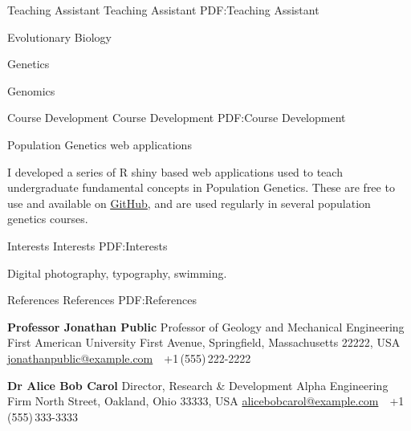 \documentclass[letterpaper,MMMyyyy,nonstopmode]{simpleresumecv}
\begin{document}
\begin{Body}
{{\SubSection
{Teaching Assistant}
{Teaching Assistant}
{PDF:Teaching Assistant}

\Gap
\BulletItem
Evolutionary Biology
\hfill
{}

\Gap
\BulletItem
Genetics
\hfill
{}

\Gap
\BulletItem
Genomics
\hfill
{}


\SubSection
{Course Development}
{Course Development}
{PDF:Course Development}

\Gap
\BulletItem
Population Genetics web applications
\hfill
{}
\begin{Detail}
\Item I developed a series of R shiny based web applications used to teach undergraduate fundamental concepts in Population Genetics. These are free to use and available on \href{https://github.com/silastittes/shiny_popgen}{\underline{GitHub}}, and are used regularly in several population genetics courses.
\end{Detail}




\iffalse



\Section
{Interests}
{Interests}
{PDF:Interests}

\Entry
Digital photography,
typography,
swimming.


\Section
{References}
{References}
{PDF:References}

\BulletItem
\textbf{Professor Jonathan Public}
\newline
Professor of Geology and Mechanical Engineering
\newline
First American University
 First Avenue, Springfield, Massachusetts 22222, USA
\newline
\href{mailto:jonathanpublic@example.com}
{jonathanpublic@example.com}
\,\SubBulletSymbol\,
+1\,(555)\,222-2222

\BigGap
\BulletItem
\textbf{Dr Alice Bob Carol}
\newline
Director, Research \& Development
\newline
Alpha Engineering Firm
 North Street, Oakland, Ohio 33333, USA
\newline
\href{mailto:alicebobcarol@example.com}
{alicebobcarol@example.com}
\,\SubBulletSymbol\,
+1\,(555)\,333-3333




}}
\end{Body}
\end{document}
